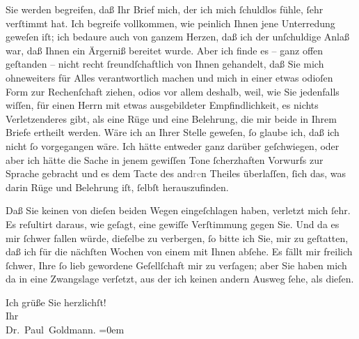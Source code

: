\pstart
           Sie werden begreifen, daß Ihr Brief mich, der ich mich ſchuldlos fühle, ſehr
               verſtimmt hat. Ich begreife vollkommen, wie peinlich Ihnen jene Unterredung geweſen
               iſt; ich bedaure auch von ganzem Herzen, daß ich der unſchuldige Anlaß war, daß Ihnen
               ein Ärgerniß bereitet wurde. Aber ich finde es – ganz offen geſtanden – {\pb}nicht recht ſreundſchaftlich von Ihnen gehandelt,
               daß Sie mich ohneweiters für Alles verantwortlich machen und mich in einer etwas
               odioſen Form zur Rechenſchaft ziehen, odios vor allem deshalb, weil, wie Sie
               jedenfalls wiſſen, \strikeout{\textcolor{gray}{e}}für einen Herrn mit etwas ausgebildeter Empfindlichkeit, es nichts
               Verletzenderes gibt, als eine Rüge und eine Belehrung, die mir beide in Ihrem Briefe
               ertheilt werden. Wäre ich an Ihrer Stelle geweſen, ſo glaube ich, daß ich nicht ſo
               vorgegangen wäre. Ich hätte entweder ganz darüber geſchwiegen, oder aber ich hätte
               die Sache in jenem gewiſſen Tone ſcherzhaften Vorwurfs zur Sprache gebracht und es
               dem Tacte des and\textcolor{gray}{re}n Theiles überlaſſen, ſich das, was darin Rüge
               und Belehrung iſt, ſelbſt herauszufinden.\pend
           
\pstart
           Daß Sie  keinen von dieſen beiden Wegen
               eingeſchlagen haben, verletzt mich ſehr. Es reſultirt daraus, wie geſagt, eine
               gewiſſe Verſtimmung gegen Sie. Und da es mir ſchwer fallen würde, dieſelbe zu
               verbergen, ſo bitte ich Sie, \strikeout{\textcolor{gray}{d}} mir zu geſtatten, daß ich für die nächſten Wochen von einem {\pb}\label{K_L02646-1v}\label{K_L02646-1}
               mit Ihnen abſehe. Es fällt mir freilich ſchwer, Ihre ſo lieb gewordene Geſellſchaft
               mir zu verſagen; aber Sie haben mich da in eine Zwangslage verſetzt, aus der ich
               keinen andern Ausweg ſehe, als dieſen.\pend
           
\pstart
           Ich grüße Sie herzlichſt! {\\[\baselineskip]}Ihr {\\[\baselineskip]}\spacefill\mbox{Dr. Paul Goldmann.}\pend
           \leftskip=0em{}\endnumbering{}  
      